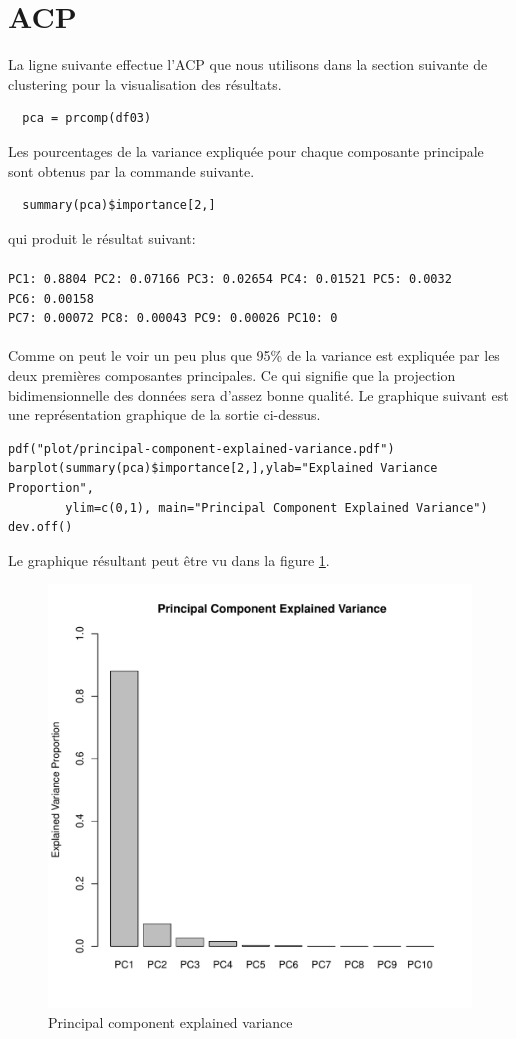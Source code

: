 \documentclass[11pt]{article}
\begin{document}
\section{ACP}
La ligne suivante effectue l'ACP que nous utilisons dans la section suivante de
clustering pour la visualisation des résultats.
\begin{verbatim}
  pca = prcomp(df03)
\end{verbatim}
Les pourcentages de la variance expliquée pour chaque composante principale sont
obtenus par la commande suivante.
\begin{verbatim}
  summary(pca)$importance[2,]
\end{verbatim}
qui produit le résultat suivant:\\\\ \texttt{PC1:\ 0.8804 PC2:\ 0.07166
  PC3:\ 0.02654 PC4:\ 0.01521 PC5:\ 0.0032 PC6:\ 0.00158 \\PC7:\ 0.00072
  PC8:\ 0.00043 PC9:\ 0.00026 PC10:\ 0}\\\\  Comme on peut le voir un peu plus
que 95\% de la variance est expliquée par les deux premières composantes
principales. Ce qui signifie que la projection bidimensionnelle des données sera
d'assez bonne qualité. Le graphique suivant est une représentation graphique de
la sortie ci-dessus.
\begin{verbatim}
pdf("plot/principal-component-explained-variance.pdf")
barplot(summary(pca)$importance[2,],ylab="Explained Variance Proportion",
        ylim=c(0,1), main="Principal Component Explained Variance")
dev.off()   
\end{verbatim}
Le graphique résultant peut être vu dans la figure
\ref{fig:principal-component-explained-variance}.\par
\begin{figure}[H]
  \centering
  \includegraphics[scale=0.4]{../plot/principal-component-explained-variance.pdf}
  \caption{Principal component explained variance}
  \label{fig:principal-component-explained-variance}
\end{figure}
\end{document}
